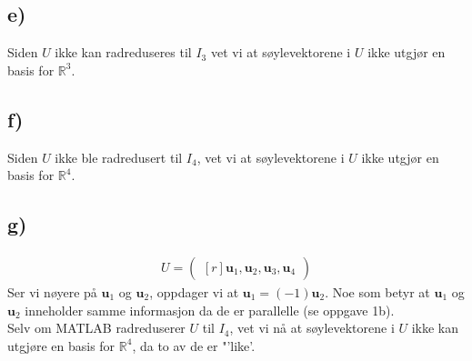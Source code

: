 \documentclass[11pt]{article}
\renewcommand{\vec}[1]{\mathbf{#1}}
\newcommand{\bpm}{\begin{pmatrix*}[r]}
\newcommand{\epm}{\end{pmatrix*}}
\begin{document}
	\subsection*{e)}
		\begin{figure}[	H]
			
			
		\end{figure}
		Siden $U$ ikke kan radreduseres til $I_{3}$ vet vi at søylevektorene i $U$ ikke utgjør en basis for $\mathbb{R}^3$.
	\subsection*{f)}
		\begin{figure}[H]
			
			
		\end{figure}
		Siden $U$ ikke ble radredusert til $I_{4}$, vet vi at søylevektorene i $U$ ikke utgjør en basis for $\mathbb{R}^4$.
	\subsection*{g)}
		\begin{figure}[H]
			
			
		\end{figure}
		\begin{align*}
			U = \bpm \vec{u}_{1} , \vec{u}_{2} , \vec{u}_{3} , \vec{u}_{4} \epm
		\end{align*}
			Ser vi nøyere på $\vec{u}_{1}$ og $\vec{u}_{2}$, oppdager vi at $\vec{u}_{1} = (-1)\vec{u}_{2}$. Noe som betyr at $\vec{u}_{1}$ og $\vec{u}_{2}$ inneholder samme informasjon da de er parallelle (se oppgave 1b).\\\indent Selv om MATLAB radreduserer $U$ til $I_{4}$, vet vi nå at søylevektorene i $U$ ikke kan utgjøre en basis for $\mathbb{R}^4$, da to av de er "'like'.
\end{document}
